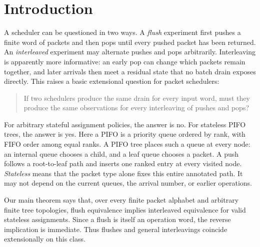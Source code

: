 \section{Introduction}
\label{sec:introduction}

A scheduler can be questioned in two ways.  A \emph{flush} experiment first
pushes a finite word of packets and then pops until every pushed packet has
been returned.  An \emph{interleaved} experiment may alternate pushes and pops
arbitrarily.  Interleaving is apparently more informative: an early pop can
change which packets remain together, and later arrivals then meet a residual
state that no batch drain exposes directly.  This raises a basic extensional
question for packet schedulers:

\begin{quote}
If two schedulers produce the same drain for every input word, must they
produce the same observations for every interleaving of pushes and pops?
\end{quote}

For arbitrary stateful assignment policies, the answer is no.  For stateless
PIFO trees, the answer is yes.  Here a PIFO is a priority queue ordered by rank,
with FIFO order among equal ranks.  A PIFO tree places such a queue at every
node: an internal queue chooses a child, and a leaf queue chooses a packet.  A
push follows a root-to-leaf path and inserts one ranked entry at every visited
node.  \emph{Stateless} means that the packet type alone fixes this entire
annotated path.  It may not depend on the current queues, the arrival number,
or earlier operations.

Our main theorem says that, over every finite packet alphabet and arbitrary
finite tree topologies, flush equivalence implies interleaved equivalence for
valid stateless assignments.  Since a flush is itself an operation word, the
reverse implication is immediate.  Thus flushes and general interleavings
coincide extensionally on this class.

